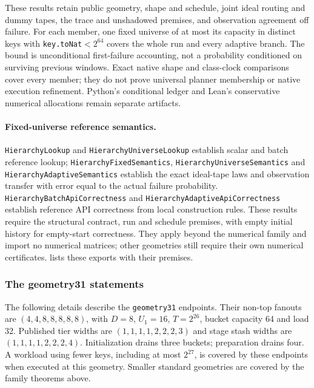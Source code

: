 \documentclass[11pt]{article}
\theoremstyle{definition}
\theoremstyle{remark}
\begin{document}
These results retain public geometry, shape and schedule, joint ideal routing
and dummy tapes, the trace and unshadowed premises, and observation agreement
off failure. For each member, one fixed universe of at most its capacity in
distinct keys with \texttt{key.toNat}$<2^{64}$ covers the whole run and every adaptive branch. The bound
is unconditional first-failure accounting, not a probability conditioned on
surviving previous windows. Exact native shape and class-clock comparisons
cover every member; they do not prove universal planner membership or native
execution refinement. Python's conditional ledger and Lean's conservative
numerical allocations remain separate artifacts.

\paragraph{Fixed-universe reference semantics.}
\texttt{HierarchyLookup} and \texttt{HierarchyUniverseLookup} establish scalar
and batch reference lookup; \texttt{HierarchyFixedSemantics},
\texttt{HierarchyUniverseSemantics} and \texttt{HierarchyAdaptiveSemantics}
establish the exact ideal-tape laws and observation transfer with error equal
to the actual failure probability. \texttt{HierarchyBatchApiCorrectness} and
\texttt{HierarchyAdaptiveApiCorrectness} establish reference API correctness
from local construction rules. These results require the structural contract,
run and schedule premises, with empty initial history for empty-start
correctness. They apply beyond the numerical family and import no numerical
matrices; other geometries still require their own numerical certificates.
 lists these exports with their premises.

\subsubsection{The geometry31 statements}
The following details describe the \texttt{geometry31} endpoints.
Their non-top fanouts are $(4,4,8,8,8,8,8)$, with $D=8$, $U_1=16$,
$T=2^{26}$, bucket capacity 64 and load 32. Published tier widths are
$(1,1,1,1,2,2,2,3)$ and stage stash widths are $(1,1,1,1,2,2,2,4)$.
Initialization drains three buckets; preparation drains four.
A workload using fewer keys, including at most $2^{27}$, is covered by these
endpoints when executed at this geometry. Smaller standard geometries are
covered by the family theorems above.
\end{document}
